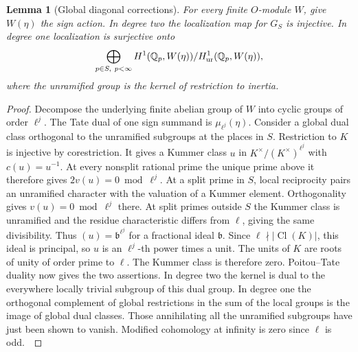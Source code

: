 \documentclass[a4paper,11pt]{article}
\newtheorem{lemma}[proposition]{Lemma}
\theoremstyle{definition}
\theoremstyle{remark}
\numberwithin{equation}{section}
\newcommand{\Cl}{\operatorname{Cl}}
\begin{document}
\begin{lemma}[Global diagonal corrections]\label{lem:diagonalpatch359}
For every finite \(O\)-module \(W\), give \(W(\eta)\) the sign
action. In degree two the localization map for \(G_S\) is
injective. In degree one localization is surjective onto
\[
 \bigoplus_{p\in S,\ p<\infty}
 H^1(\mathbb Q_p,W(\eta))/H^1_{\rm ur}(\mathbb Q_p,W(\eta)),
\]
where the unramified group is the kernel of restriction to inertia.
\end{lemma}
\begin{proof}
Decompose the underlying finite abelian group of \(W\) into
cyclic groups of order \(\ell^j\). The Tate dual of one sign
summand is \(\mu_{\ell^j}(\eta)\). Consider a global dual class
orthogonal to the unramified subgroups at the places in \(S\).
Restriction to \(K\) is injective by corestriction.
It gives a Kummer class \(u\) in
\(K^\times/(K^\times)^{\ell^j}\) with \(c(u)=u^{-1}\).
At every nonsplit rational prime the unique prime above it
therefore gives \(2v(u)=0\bmod\ell^j\). At a split prime in
\(S\), local reciprocity pairs an unramified character with
the valuation of a Kummer element. Orthogonality gives
\(v(u)=0\bmod\ell^j\) there. At split primes outside \(S\)
the Kummer class is unramified and the residue characteristic
differs from \(\ell\), giving the same divisibility.
Thus \((u)=\mathfrak b^{\ell^j}\) for a fractional ideal
\(\mathfrak b\). Since \(\ell\nmid |\Cl(K)|\), this ideal is
principal, so \(u\) is an \(\ell^j\)-th power times a unit.
The units of \(K\) are roots of unity of order prime to \(\ell\). The Kummer
class is therefore zero. Poitou--Tate duality now gives the two
assertions. In degree two the kernel is dual to the everywhere
locally trivial subgroup of this dual group. In degree one
the orthogonal complement of global restrictions in the sum
of the local groups is the image of global dual classes.
Those annihilating all the unramified subgroups have just been
shown to vanish. Modified cohomology at infinity is zero since
\(\ell\) is odd.~\cite{VII-V-V-milne98}
\end{proof}
\end{document}

